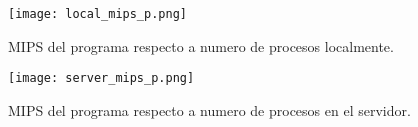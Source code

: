 

\begin{figure}
	\centering
	\texttt{[image: local\_mips\_p.png]}
	\caption{MIPS del programa respecto a numero de procesos localmente.}
	\label{fig:local_mips_p}
\end{figure}



\begin{figure}
	\centering
	\texttt{[image: server\_mips\_p.png]}
	\caption{MIPS del programa respecto a numero de procesos en el servidor.}
	\label{fig:server_mips_p}
\end{figure}